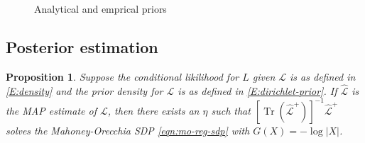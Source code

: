 \documentclass[12pt]{article}
\DeclareMathOperator*{\Tr}{Tr}
\theoremstyle{plain}
\newtheorem{proposition}[theorem]{Proposition}
\begin{document}
\begin{figure}
{      
    }
    \caption{Analytical and emprical priors}
\end{figure}



\subsection{Posterior estimation}
\label{S:posterior-density}

\begin{proposition}\label{P:map-sdp}
  Suppose the conditional likilihood for $L$ given $\mathcal{L}$ is as
  defined in \eqref{E:density} and the prior density for $\mathcal{L}$
  is as defined in \eqref{E:dirichlet-prior}.  If
  $\mathcal{\hat L}$ is the MAP estimate of $\mathcal{L}$, then
  there exists an $\eta$ such that
  $[\Tr(\mathcal{\hat L}^+)]^{-1} \mathcal{\hat L}^+$ solves the
  Mahoney-Orecchia SDP \eqref{eqn:mo-reg-sdp} with $G(X) = -\log |X|$.
\end{proposition}
\end{document}
